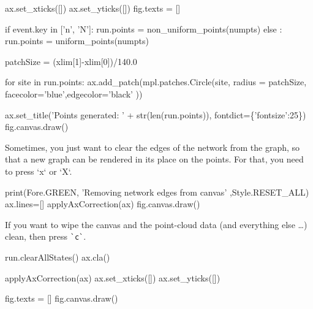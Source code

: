 ax.set_xticks([])
ax.set_yticks([])
fig.texts = []
                 
if event.key in ['n', 'N']: 
        run.points = non_uniform_points(numpts)
else : 
        run.points = uniform_points(numpts)

patchSize  = (xlim[1]-xlim[0])/140.0

for site in run.points:      
    ax.add_patch(mpl.patches.Circle(site, radius = patchSize, \\
                 facecolor='blue',edgecolor='black' ))

ax.set_title('Points generated: ' + str(len(run.points)), fontdict=\{'fontsize':25\})
fig.canvas.draw()
\nwendcode{}\nwdocspar



Sometimes, you just want to clear the edges of the network from the graph, so that
a new graph can be rendered in its place on the points. For that, you need to press
`x` or `X`. 

\nwenddocs{}\endmoddef\nwstartdeflinemarkup{}\nwenddeflinemarkup
print(Fore.GREEN, 'Removing network edges from canvas' ,Style.RESET_ALL)
ax.lines=[]
applyAxCorrection(ax)
fig.canvas.draw()
\nwendcode{}\nwdocspar

If you want to wipe the canvas and the point-cloud data (and everything else \ldots) clean, 
then press \verb|`c`|. 

\nwenddocs{}\endmoddef\nwstartdeflinemarkup{}\nwenddeflinemarkup
run.clearAllStates()
ax.cla()
                                 
applyAxCorrection(ax)
ax.set_xticks([])
ax.set_yticks([])
                                    
fig.texts = []
fig.canvas.draw()
\nwendcode{}\nwdocspar






